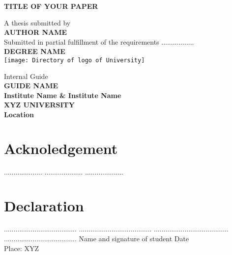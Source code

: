 \documentclass[12pt]{report}
\begin{document}
\begin{titlepage}
    \doublespacing
    \centering
    \vspace*{2cm}
    \large
    \textbf{\MakeUppercase{TITLE OF YOUR PAPER}}

    \Large
    A thesis submitted by\\[0.3cm]
    \textbf{AUTHOR NAME}\\[1cm]

    Submitted in partial fulfillment of the requirements .................\\[0.3cm]
    \textbf{DEGREE NAME}\\[1cm]
    \texttt{[image: Directory of logo of University]}

    Internal Guide\\
    \textbf{GUIDE NAME}\\[0.5cm]
    \normalsize
    \textbf{Institute Name \& Institute Name}\\
    \textbf{XYZ UNIVERSITY}\\
    \textbf{Location}
\end{titlepage}
\restoregeometry

\onehalfspacing

\chapter*{Acknoledgement}
....................
....................
....................

\chapter*{Declaration}
......................................
......................................
.......................................
......................................
\vspace{10cm}
Name and signature of student \hfill Date\\
Place: XYZ

\newpage

\tableofcontents
\newpage

\begin{abstract}
    ...................................
    ...................................
    ...................................
    ...................................
    ...................................
\end{abstract}
\end{document}
